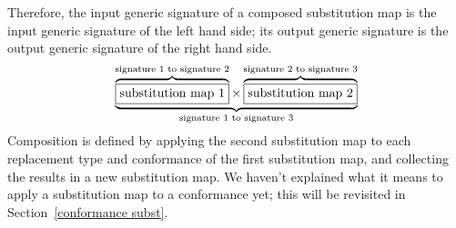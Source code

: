 \documentclass[a4paper,headsepline,bibliography=totoc,toc=flat,fleqn,twoside=semi]{scrbook}
\theoremstyle{definition}
\theoremstyle{definition}
\theoremstyle{definition}
\newcommand{\mathboxed}[1]{\boxed{\mbox{\vphantom{pI\texttt{pI}}#1}}}
\newcommand{\SubMap}[1]{\begin{tabular}{|lll|}
\hline
\multicolumn{3}{|l|}{\textbf{Types}}\\
\hline
#1\\
\hline
\end{tabular}}
\newcommand{\SubType}[2]{\texttt{#1}&$:=$&\texttt{#2}}
\begin{document}
Therefore, the input generic signature of a composed substitution map is the input generic signature of the left hand side; its output generic signature is the output generic signature of the right hand side.
\[
\underbrace{
\overbrace{\mathboxed{substitution map 1}}^{\text{signature 1 to signature 2}} \times
\overbrace{\mathboxed{substitution map 2}}^{\text{signature 2 to signature 3}}
}_{
\text{signature 1 to signature 3}}
\]
Composition is defined by applying the second substitution map to each replacement type and conformance of the first substitution map, and collecting the results in a new substitution map. We haven't explained what it means to apply a substitution map to a conformance yet; this will be revisited in Section~\ref{conformance subst}.

\newcommand{\FirstMapInExample}{\SubMap{
\SubType{T}{Array<A>}\\
\SubType{U}{A}
}}
\newcommand{\SecondMapInExample}{\SubMap{
\SubType{A}{Int}
}}
\newcommand{\ThirdMapInExample}{\SubMap{
\SubType{T}{Array<Int>}\\
\SubType{U}{Int}
}}
\end{document}
